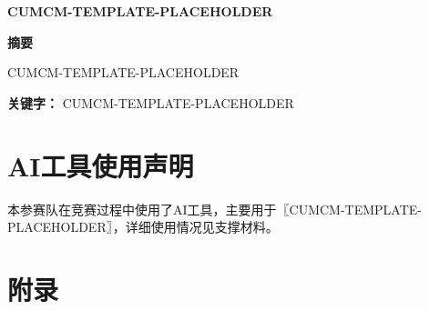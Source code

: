 \documentclass[fontset=mac, 12pt, a4paper]{ctexart}
\newcommand{\papertitle}[1]{%
  \begin{center}
    {\fontsize{17.3pt}{22pt}\bfseries #1}
  \end{center}
  \vspace{1em}
}
\newcommand{\abstractcn}[2]{%
  \begin{center}{\fontsize{14pt}{17pt}\bfseries 摘要}\end{center}
  #1\par
  \vspace{1em}
  {\heiti\bfseries 关键字：}#2\par
  \newpage
}
\newcommand{\referencescn}{%
}
\newcommand{\aiusagedeclaration}[1]{%
  \section*{AI工具使用声明}%
  #1\par
}
\newcommand{\appendixcn}{%
  \section*{附录}%
}
\begin{document}
\papertitle{CUMCM-TEMPLATE-PLACEHOLDER}

\abstractcn{%
  CUMCM-TEMPLATE-PLACEHOLDER%
}{%
  CUMCM-TEMPLATE-PLACEHOLDER%
}











\newpage
\aiusagedeclaration{本参赛队在竞赛过程中使用了AI工具，主要用于〖CUMCM-TEMPLATE-PLACEHOLDER〗，详细使用情况见支撑材料。}
\newpage
\referencescn
\newpage
\appendixcn
\end{document}
